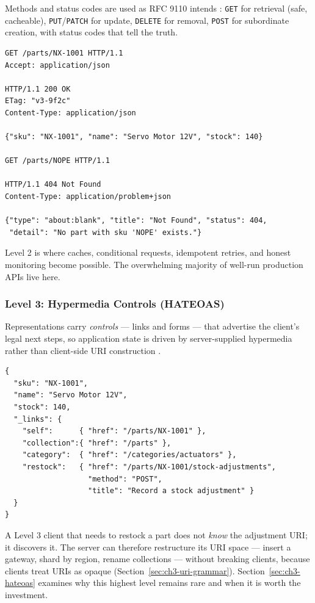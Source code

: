 Methods and status codes are used as RFC 9110 intends \cite{rfc9110}: \texttt{GET}
for retrieval (safe, cacheable), \texttt{PUT}/\texttt{PATCH} for update,
\texttt{DELETE} for removal, \texttt{POST} for subordinate creation, with status
codes that tell the truth.

\begin{verbatim}
GET /parts/NX-1001 HTTP/1.1
Accept: application/json

HTTP/1.1 200 OK
ETag: "v3-9f2c"
Content-Type: application/json

{"sku": "NX-1001", "name": "Servo Motor 12V", "stock": 140}

GET /parts/NOPE HTTP/1.1

HTTP/1.1 404 Not Found
Content-Type: application/problem+json

{"type": "about:blank", "title": "Not Found", "status": 404,
 "detail": "No part with sku 'NOPE' exists."}
\end{verbatim}

Level 2 is where caches, conditional requests, idempotent retries, and honest
monitoring become possible. The overwhelming majority of well-run production APIs
live here.

\subsubsection{Level 3: Hypermedia Controls (HATEOAS)}

Representations carry \emph{controls} --- links and forms --- that advertise the
client's legal next steps, so application state is driven by server-supplied
hypermedia rather than client-side URI construction \cite{rfc8288}.

\begin{verbatim}
{
  "sku": "NX-1001",
  "name": "Servo Motor 12V",
  "stock": 140,
  "_links": {
    "self":      { "href": "/parts/NX-1001" },
    "collection":{ "href": "/parts" },
    "category":  { "href": "/categories/actuators" },
    "restock":   { "href": "/parts/NX-1001/stock-adjustments",
                   "method": "POST",
                   "title": "Record a stock adjustment" }
  }
}
\end{verbatim}

A Level 3 client that needs to restock a part does not \emph{know} the adjustment
URI; it discovers it. The server can therefore restructure its URI space ---
insert a gateway, shard by region, rename collections --- without breaking
clients, because clients treat URIs as opaque (Section~\ref{sec:ch3-uri-grammar}).
Section~\ref{sec:ch3-hateoas} examines why this highest level remains rare and
when it is worth the investment.

